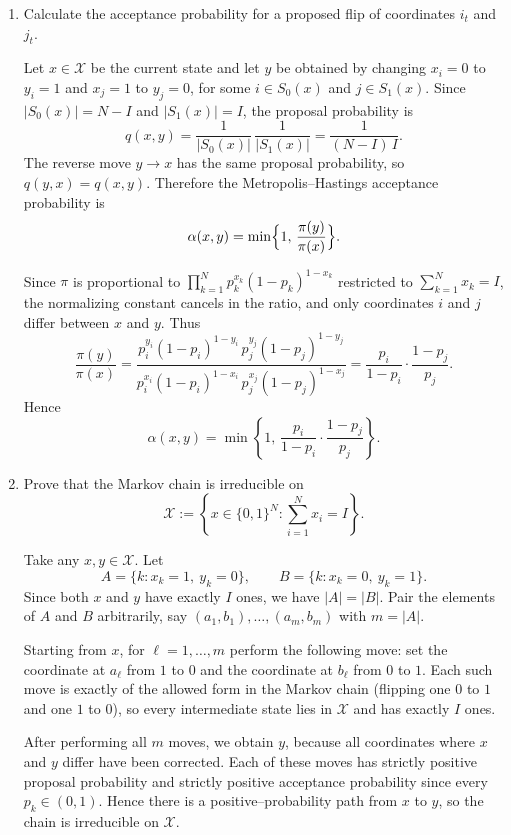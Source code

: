 \documentclass[answers,12pt,addpoints]{exam}
\begin{document}
\begin{enumerate}
  \item Calculate the acceptance probability for a proposed flip of coordinates $i_t$ and $j_t$.

\begin{solution}
Let $x \in \mathcal{X}$ be the current state and let $y$ be obtained by
changing $x_i = 0$ to $y_i = 1$ and $x_j = 1$ to $y_j = 0$, for some
$i \in S_0(x)$ and $j \in S_1(x)$. Since $|S_0(x)| = N-I$ and
$|S_1(x)| = I$, the proposal probability is
\[
  q(x,y) = \frac{1}{|S_0(x)|}\,\frac{1}{|S_1(x)|}
         = \frac{1}{(N-I)\,I}.
\]
The reverse move $y \to x$ has the same proposal probability, so
$q(y,x) = q(x,y)$. Therefore the Metropolis–Hastings acceptance
probability is
\[
  \alpha(x,y) = \min\Bigl\{1,\, \frac{\pi(y)}{\pi(x)}\Bigr\}.
\]

Since $\pi$ is proportional to
$ \prod_{k=1}^N p_k^{x_k} (1-p_k)^{1-x_k} $
restricted to $\sum_{k=1}^N x_k = I$, the normalizing constant cancels in
the ratio, and only coordinates $i$ and $j$ differ between $x$ and $y$.
Thus
\[
  \frac{\pi(y)}{\pi(x)}
  = \frac{p_i^{y_i}(1-p_i)^{1-y_i}\,p_j^{y_j}(1-p_j)^{1-y_j}}
         {p_i^{x_i}(1-p_i)^{1-x_i}\,p_j^{x_j}(1-p_j)^{1-x_j}}
  = \frac{p_i}{1-p_i} \cdot \frac{1-p_j}{p_j}.
\]
Hence
\[
  \alpha(x,y)
  = \min\left\{1,\,
      \frac{p_i}{1-p_i}\cdot\frac{1-p_j}{p_j}
    \right\}. 
  \]
\end{solution}

  \item Prove that the Markov chain is irreducible on
  \[
  \mathcal{X} := \left\{x \in \{0,1\}^N : \sum_{i=1}^N x_i = I\right\}.
  \]

  \begin{solution}
Take any $x,y \in \mathcal{X}$. Let
\[
  A = \{k : x_k = 1,\ y_k = 0\},
  \qquad
  B = \{k : x_k = 0,\ y_k = 1\}.
\]
Since both $x$ and $y$ have exactly $I$ ones, we have $|A| = |B|$. Pair
the elements of $A$ and $B$ arbitrarily, say $(a_1,b_1),\dots,(a_m,b_m)$
with $m = |A|$.

Starting from $x$, for $\ell = 1,\dots,m$ perform the following move:
set the coordinate at $a_\ell$ from $1$ to $0$ and the coordinate at
$b_\ell$ from $0$ to $1$. Each such move is exactly of the allowed form
in the Markov chain (flipping one $0$ to $1$ and one $1$ to $0$), so
every intermediate state lies in $\mathcal{X}$ and has exactly $I$ ones.

After performing all $m$ moves, we obtain $y$, because all coordinates
where $x$ and $y$ differ have been corrected. Each of these moves has
strictly positive proposal probability and strictly positive acceptance
probability since every $p_k \in (0,1)$. Hence there is a positive–probability
path from $x$ to $y$, so the chain is irreducible on $\mathcal{X}$. \qedhere
\end{solution}


\end{enumerate}
\end{document}
